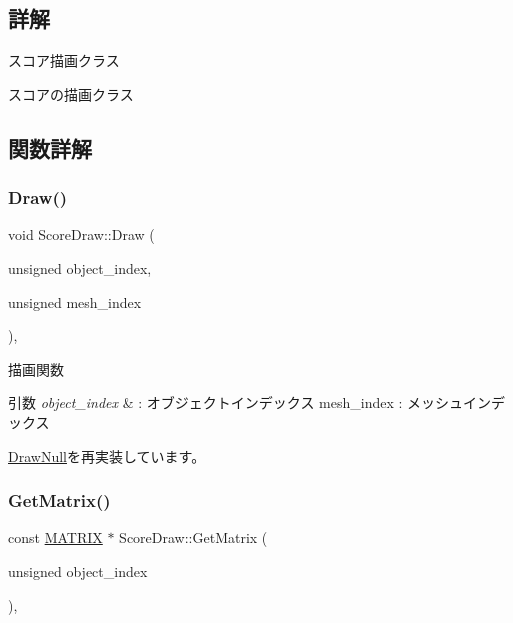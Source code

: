 \subsection{詳解}
スコア描画クラス 

スコアの描画クラス 

\subsection{関数詳解}
\mbox{\label{class_score_draw_a799e71943140a264cedba6002308b976}} 
\subsubsection{\texorpdfstring{Draw()}{Draw()}}
{\footnotesize\ttfamily void Score\+Draw\+::\+Draw (\begin{DoxyParamCaption}\item[{unsigned}]{object\+\_\+index,  }\item[{unsigned}]{mesh\+\_\+index }\end{DoxyParamCaption})\hspace{0.3cm}{\ttfamily [override]}, {\ttfamily [virtual]}}



描画関数 


\begin{DoxyParams}{引数}
{\em object\+\_\+index} & \+: オブジェクトインデックス mesh\+\_\+index \+: メッシュインデックス \\
\hline
\end{DoxyParams}


\mbox{\hyperlink{class_draw_null_afe50f6fd820b18d673f70f048743f339}{Draw\+Null}}を再実装しています。

\mbox{\label{class_score_draw_a62aa20ef4b40544bf0a95770b925c780}} 
\subsubsection{\texorpdfstring{Get\+Matrix()}{GetMatrix()}}
{\footnotesize\ttfamily const \mbox{\hyperlink{_vector3_d_8h_a032295cd9fb1b711757c90667278e744}{M\+A\+T\+R\+IX}} $\ast$ Score\+Draw\+::\+Get\+Matrix (\begin{DoxyParamCaption}\item[{unsigned}]{object\+\_\+index }\end{DoxyParamCaption})\hspace{0.3cm}{\ttfamily [override]}, {\ttfamily [virtual]}}



